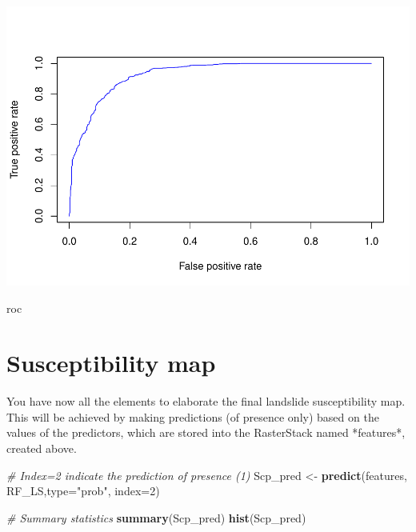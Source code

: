 \documentclass[
]{book}
\newenvironment{Shaded}{\begin{snugshade}}{\end{snugshade}}
\newcommand{\AttributeTok}[1]{\textcolor[rgb]{0.13,0.29,0.53}{#1}}
\newcommand{\CommentTok}[1]{\textcolor[rgb]{0.56,0.35,0.01}{\textit{#1}}}
\newcommand{\DecValTok}[1]{\textcolor[rgb]{0.00,0.00,0.81}{#1}}
\newcommand{\FunctionTok}[1]{\textcolor[rgb]{0.13,0.29,0.53}{\textbf{#1}}}
\newcommand{\NormalTok}[1]{#1}
\newcommand{\OtherTok}[1]{\textcolor[rgb]{0.56,0.35,0.01}{#1}}
\newcommand{\StringTok}[1]{\textcolor[rgb]{0.31,0.60,0.02}{#1}}
\begin{document}
\includegraphics{06-RF_files/figure-latex/RF-val-1.pdf}

\begin{Shaded}
\begin{Highlighting}[]
\NormalTok{roc }
\end{Highlighting}
\end{Shaded}

\hypertarget{susceptibility-map}{%
\section{Susceptibility map}\label{susceptibility-map}}

You have now all the elements to elaborate the final landslide susceptibility map.
This will be achieved by making predictions (of presence only) based on the values of the predictors, which are stored into the RasterStack named *features*, created above.

\begin{Shaded}
\begin{Highlighting}[]
\CommentTok{\# Index=2 indicate the prediction of presence (1) }
\NormalTok{Scp\_pred }\OtherTok{\textless{}{-}} \FunctionTok{predict}\NormalTok{(features, RF\_LS,}\AttributeTok{type=}\StringTok{"prob"}\NormalTok{, }\AttributeTok{index=}\DecValTok{2}\NormalTok{)}

\CommentTok{\# Summary statistics}
\FunctionTok{summary}\NormalTok{(Scp\_pred)}
\FunctionTok{hist}\NormalTok{(Scp\_pred)}
\end{Highlighting}
\end{Shaded}
\end{document}

